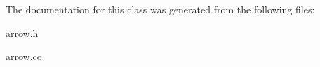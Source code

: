 The documentation for this class was generated from the following files\-:\begin{DoxyCompactItemize}
\item 
\hyperlink{arrow_8h}{arrow.\-h}\item 
\hyperlink{arrow_8cc}{arrow.\-cc}\end{DoxyCompactItemize}
